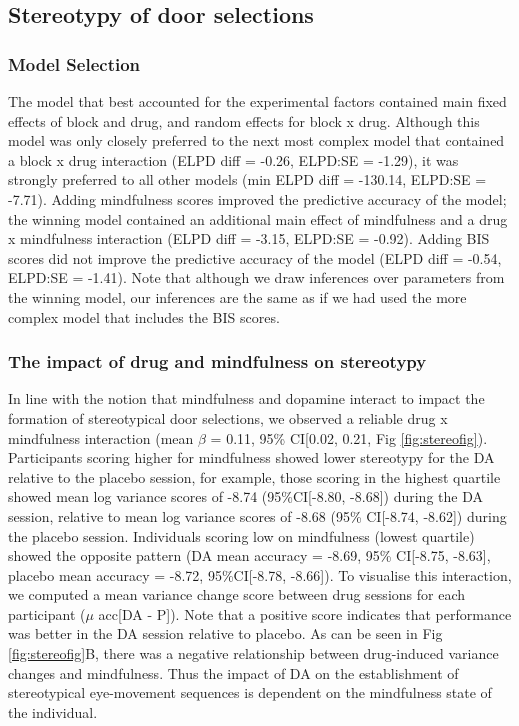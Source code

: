 \documentclass{article}
\begin{document}
\hypertarget{stereotypy-of-door-selections}{%
\subsection{Stereotypy of door
selections}\label{stereotypy-of-door-selections}}

\hypertarget{model-selection-2}{%
\subsubsection{Model Selection}\label{model-selection-2}}

The model that best accounted for the experimental factors contained
main fixed effects of block and drug, and random effects for block x
drug. Although this model was only closely preferred to the next most
complex model that contained a block x drug interaction (ELPD diff =
-0.26, ELPD:SE = -1.29), it was strongly preferred to all other models
(min ELPD diff = -130.14, ELPD:SE = -7.71). Adding mindfulness scores
improved the predictive accuracy of the model; the winning model
contained an additional main effect of mindfulness and a drug x
mindfulness interaction (ELPD diff = -3.15, ELPD:SE = -0.92). Adding BIS
scores did not improve the predictive accuracy of the model (ELPD diff =
-0.54, ELPD:SE = -1.41). Note that although we draw inferences over
parameters from the winning model, our inferences are the same as if we
had used the more complex model that includes the BIS scores.

\hypertarget{the-impact-of-drug-and-mindfulness-on-stereotypy}{%
\subsubsection{The impact of drug and mindfulness on
stereotypy}\label{the-impact-of-drug-and-mindfulness-on-stereotypy}}

In line with the notion that mindfulness and dopamine interact to impact
the formation of stereotypical door selections, we observed a reliable
drug x mindfulness interaction (mean \(\beta\) = 0.11, 95\% CI{[}0.02,
0.21, Fig \ref{fig:stereofig}). Participants scoring higher for
mindfulness showed lower stereotypy for the DA relative to the placebo
session, for example, those scoring in the highest quartile showed mean
log variance scores of -8.74 (95\%CI{[}-8.80, -8.68{]}) during the DA
session, relative to mean log variance scores of -8.68 (95\% CI{[}-8.74,
-8.62{]}) during the placebo session. Individuals scoring low on
mindfulness (lowest quartile) showed the opposite pattern (DA mean
accuracy = -8.69, 95\% CI{[}-8.75, -8.63{]}, placebo mean accuracy =
-8.72, 95\%CI{[}-8.78, -8.66{]}). To visualise this interaction, we
computed a mean variance change score between drug sessions for each
participant (\(\mu\) acc{[}DA - P{]}). Note that a positive score
indicates that performance was better in the DA session relative to
placebo. As can be seen in Fig \ref{fig:stereofig}B, there was a
negative relationship between drug-induced variance changes and
mindfulness. Thus the impact of DA on the establishment of stereotypical
eye-movement sequences is dependent on the mindfulness state of the
individual.
\end{document}
